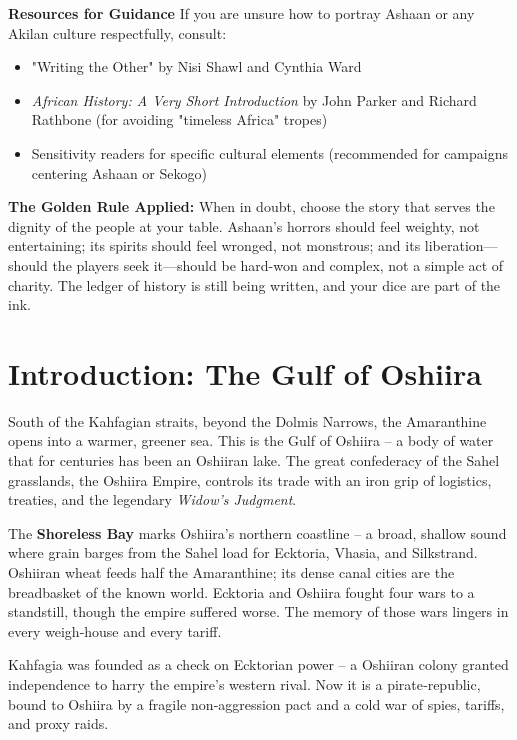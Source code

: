 \documentclass[11pt]{book}
\begin{document}
\begin{tcolorbox}[colback=black!5!white,colframe=crimson!75!black,title=Lines and Veils: Navigating Ashaan and Historical Trauma]
\textbf{Resources for Guidance}
If you are unsure how to portray Ashaan or any Akilan culture respectfully, consult:
\begin{itemize}
    \item "Writing the Other" by Nisi Shawl and Cynthia Ward
    \item \textit{African History: A Very Short Introduction} by John Parker and Richard Rathbone (for avoiding "timeless Africa" tropes)
    \item Sensitivity readers for specific cultural elements (recommended for campaigns centering Ashaan or Sekogo)
\end{itemize}

\textbf{The Golden Rule Applied:}
When in doubt, choose the story that serves the dignity of the people at your table. Ashaan's horrors should feel weighty, not entertaining; its spirits should feel wronged, not monstrous; and its liberation---should the players seek it---should be hard-won and complex, not a simple act of charity. The ledger of history is still being written, and your dice are part of the ink.
\end{tcolorbox}

\tableofcontents

\mainmatter

\chapter{Introduction: The Gulf of Oshiira}

South of the Kahfagian straits, beyond the Dolmis Narrows, the Amaranthine opens into a warmer, greener sea. This is the Gulf of Oshiira -- a body of water that for centuries has been an Oshiiran lake. The great confederacy of the Sahel grasslands, the Oshiira Empire, controls its trade with an iron grip of logistics, treaties, and the legendary \textit{Widow's Judgment}.

The \textbf{Shoreless Bay} marks Oshiira's northern coastline -- a broad, shallow sound where grain barges from the Sahel load for Ecktoria, Vhasia, and Silkstrand. Oshiiran wheat feeds half the Amaranthine; its dense canal cities are the breadbasket of the known world. Ecktoria and Oshiira fought four wars to a standstill, though the empire suffered worse. The memory of those wars lingers in every weigh‑house and every tariff.

Kahfagia was founded as a check on Ecktorian power -- a Oshiiran colony granted independence to harry the empire's western rival. Now it is a pirate‑republic, bound to Oshiira by a fragile non‑aggression pact and a cold war of spies, tariffs, and proxy raids.
\end{document}
